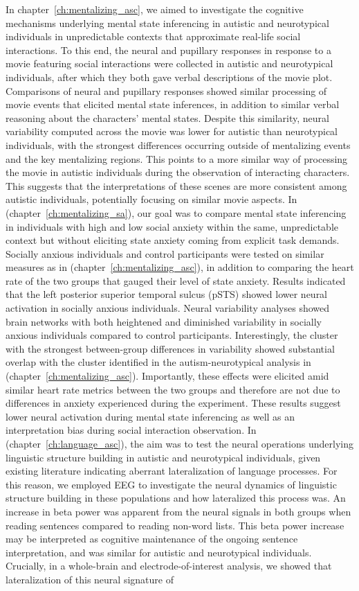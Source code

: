 In chapter~\ref{ch:mentalizing_asc}, we aimed to investigate the cognitive mechanisms underlying mental state inferencing in autistic and neurotypical individuals in unpredictable contexts that approximate real-life social interactions. To this end, the neural and pupillary responses in response to a movie featuring social interactions were collected in autistic and neurotypical individuals, after which they both gave verbal descriptions of the movie plot. Comparisons of neural and pupillary responses showed similar processing of movie events that elicited mental state inferences, in addition to similar verbal reasoning about the characters' mental states. Despite this similarity, neural variability computed across the movie was lower for autistic than neurotypical individuals, with the strongest differences occurring outside of mentalizing events and the key mentalizing regions. This points to a more similar way of processing the movie in autistic individuals during the observation of interacting characters. This suggests that the interpretations of these scenes are more consistent among autistic individuals, potentially focusing on similar movie aspects. In (chapter~\ref{ch:mentalizing_sa}), our goal was to compare mental state inferencing in individuals with high and low social anxiety within the same, unpredictable context but without eliciting state anxiety coming from explicit task demands. Socially anxious individuals and control participants were tested on similar measures as in (chapter~\ref{ch:mentalizing_asc}), in addition to comparing the heart rate of the two groups that gauged their level of state anxiety. Results indicated that the left posterior superior temporal sulcus (pSTS) showed lower neural activation in socially anxious individuals. Neural variability analyses showed brain networks with both heightened and diminished variability in socially anxious individuals compared to control participants. Interestingly, the cluster with the strongest between-group differences in variability showed substantial overlap with the cluster identified in the autism-neurotypical analysis in (chapter~\ref{ch:mentalizing_asc}). Importantly, these effects were elicited amid similar heart rate metrics between the two groups and therefore are not due to differences in anxiety experienced during the experiment. These results suggest lower neural activation during mental state inferencing as well as an interpretation bias during social interaction observation. In (chapter~\ref{ch:language_asc}), the aim was to test the neural operations underlying linguistic structure building in autistic and neurotypical individuals, given existing literature indicating aberrant lateralization of language processes. For this reason, we employed EEG to investigate the neural dynamics of linguistic structure building in these populations and how lateralized this process was. An increase in beta power was apparent from the neural signals in both groups when reading sentences compared to reading non-word lists. This beta power increase may be interpreted as cognitive maintenance of the ongoing sentence interpretation, and was similar for autistic and neurotypical individuals. Crucially, in a whole-brain and electrode-of-interest analysis, we showed that lateralization of this neural signature of 